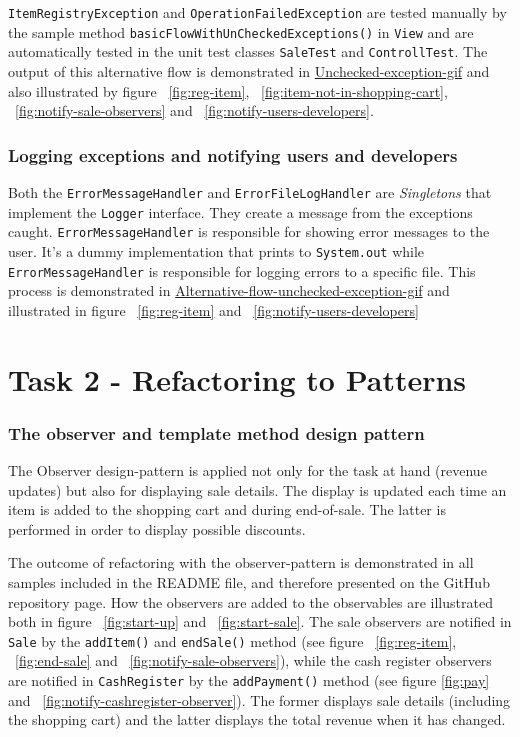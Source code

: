 \documentclass[a4paper]{scrreprt}
\begin{document}
\texttt{ItemRegistryException} and \texttt{OperationFailedException}
are tested manually
by the sample method \texttt{basicFlowWithUnCheckedExceptions()}
in \verb|View| and are automatically tested in the unit test
classes \verb|SaleTest| and \verb|ControllTest|.
The output of this alternative flow is demonstrated in
\href{https://github.com/VincentFerrigan/kth-iv1350-object-oriented-design#alternative-flow---unchecked-exception}{Unchecked-exception-gif}
and also illustrated by
figure ~\ref{fig:reg-item}, ~\ref{fig:item-not-in-shopping-cart}, ~\ref{fig:notify-sale-observers} and ~\ref{fig:notify-users-developers}.

\subsubsection{Logging exceptions and notifying users and developers}
Both the \texttt{ErrorMessageHandler} and \texttt{ErrorFileLogHandler}
are \emph{Singletons} that implement the \texttt{Logger} interface.
They create a message from the exceptions
caught.
\texttt{ErrorMessageHandler}
is responsible for showing error messages to the user.
It's a dummy implementation that prints to
\texttt{System.out} while
\texttt{ErrorMessageHandler}
is responsible for logging errors to a specific file.
This process is demonstrated in
\href{https://github.com/VincentFerrigan/kth-iv1350-object-oriented-design#alternative-flow---unchecked-exception}{Alternative-flow-unchecked-exception-gif}
and illustrated in
figure ~\ref{fig:reg-item} and ~\ref{fig:notify-users-developers}

\newpage
\section*{Task 2 - Refactoring to Patterns}
\subsubsection{The observer and template method design pattern}
The Observer design-pattern is applied not only for the task at hand (revenue updates)
but also for displaying sale details.
The display is updated each time an item is added to the shopping cart
and during end-of-sale.
The latter is performed in order to display possible discounts.

The outcome of refactoring with the observer-pattern
is demonstrated in all samples included in the README file,
and therefore presented on the GitHub repository page.
How the observers are added to the observables are illustrated both
in figure ~\ref{fig:start-up} and ~\ref{fig:start-sale}.
The sale observers are notified in \texttt{Sale} by the
\texttt{addItem()} and
\texttt{endSale()} method
(see figure ~\ref{fig:reg-item}, ~\ref{fig:end-sale}
and ~\ref{fig:notify-sale-observers}),
while the cash register observers are notified in
\texttt{CashRegister} by the
\texttt{addPayment()} method
(see figure \ref{fig:pay} and ~\ref{fig:notify-cashregister-observer}).
The former displays sale details (including the shopping cart)
and the latter displays the total revenue
when it has changed.
\end{document}
